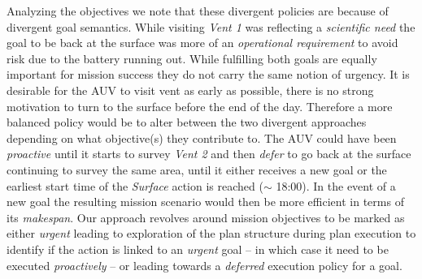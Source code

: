 Analyzing the objectives we note that these divergent policies are
because of divergent goal semantics. While visiting {\em Vent 1} was
reflecting a \emph{scientific need} the goal to be back at the surface
was more of an \emph{operational requirement} to avoid risk due to the
battery running out. While fulfilling both goals are equally important
for mission success they do not carry the same notion of urgency. It
is desirable for the AUV to visit vent as early as possible, there is
no strong motivation to turn to the surface before the end of the
day. Therefore a more balanced policy would be to alter between the
two divergent approaches depending on what objective(s) they
contribute to. The AUV could have been {\em proactive} until it starts
to survey {\em Vent 2} and then {\em defer} to go back at the surface
continuing to survey the same area, until it either receives a new
goal or the earliest start time of the \emph{Surface} action is
reached ($\sim$ 18:00). In the event of a new goal
the resulting mission scenario would then be more efficient in terms
of its \emph{makespan}. Our approach revolves around mission
objectives to be marked as either {\em urgent} leading to exploration
of the plan structure during plan execution to identify if the action
is linked to an {\em urgent} goal -- in which case it need to be
executed {\em proactively} -- or leading towards a {\em deferred}
execution policy for a goal.
 


